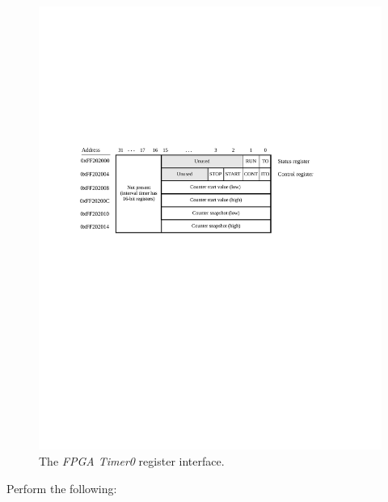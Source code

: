 \documentclass[epsfig,10pt,fullpage]{article}
\begin{document}
~\\
\begin{figure}[htb]
	\begin{center}
	\includegraphics[scale=1]{figures/fig_interval_port.pdf}
	\end{center}
	\caption{The {\it FPGA Timer0} register interface.}
\label{fig:timer}
\end{figure}

\noindent
Perform the following:
\end{document}
